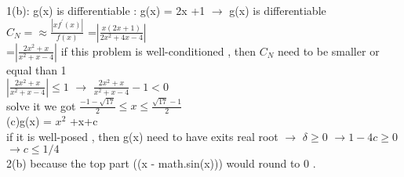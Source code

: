 \documentclass[18pt]{article}
\author{baibizhe}
\begin{document}
1(b):
    g(x) is differentiable : g(x) = 2x +1 $\rightarrow$ g(x) is differentiable\\
    $C_{N}= \approx \frac{\left|x f^{\prime}(x)\right|}{f(x)}$ =$\left|\frac{x\left(2x +1\right)}{2x^2+4x-4}\right|$ \\
    =$\left|\frac{2x^2+x}{x^2+x-4}\right|$
     if this problem is well-conditioned , then $C_{N}$ need to be smaller or equal than 1\\
    $\left|\frac{2x^2+x}{x^2+x-4}\right| \leq 1$ $\rightarrow$  $\frac{2 x^{2}+x}{x^{2}+x-4}-1<0$ \\
    solve it we got  $\frac{-1-\sqrt{17}}{2}\leq x \leq \frac{\sqrt{17}-1}{2}$ \\
(c)g(x) = $x^2$ +x+c \\
    if it is well-posed , then g(x) need to have exits real root $\rightarrow$ $\delta \geq 0 $ $\rightarrow 1 -4c  \geq 0$ $\rightarrow c \leq 1/4$\\
    2(b) because the top part ((x - math.sin(x))) would round to 0 .
\end{document}

